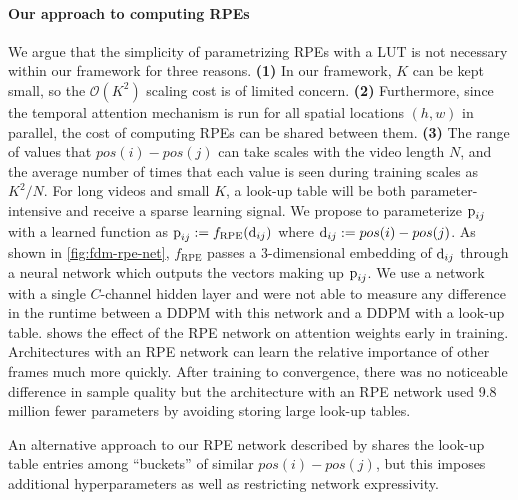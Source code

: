\paragraph{Our approach to computing RPEs}
We argue that the simplicity of parametrizing RPEs with a LUT is not necessary within our framework for three reasons. 
\textbf{(1)} In our framework, $K$ can be kept small, so the $\mathcal{O}(K^2)$ scaling cost is of limited concern. 
\textbf{(2)} Furthermore, since the temporal attention mechanism is run for all spatial locations $(h, w)$ in parallel, the cost of computing RPEs can be shared between them.
\textbf{(3)} The range of values that $pos(i)-pos(j)$ can take scales with the video length $N$, and the average number of times that each value is seen during training scales as ${K^2/N}$. For long videos and small $K$, a look-up table will be both parameter-intensive and receive a sparse learning signal. 
%
We propose to parameterize ${\textnormal{p}}_{ij}$ with a learned function as ${{\textnormal{p}}_{ij} := f_\text{RPE}({\textnormal{d}}_{ij})}$ where ${\textnormal{d}}_{ij} := pos(i)-pos(j)$. As shown in \cref{fig:fdm-rpe-net}, $f_\text{RPE}$ passes a 3-dimensional embedding of ${\textnormal{d}}_{ij}$ through a neural network which outputs the vectors making up ${\textnormal{p}}_{ij}$. We use a network with a single $C$-channel hidden layer and were not able to measure any difference in the runtime between a DDPM with this network and a DDPM with a look-up table.   shows the effect of the RPE network on attention weights early in training. Architectures with an RPE network can learn the relative importance of other frames much more quickly. After training to convergence, there was no noticeable difference in sample quality but the architecture with an RPE network used 9.8 million fewer parameters by avoiding storing large look-up tables.

An alternative approach to our RPE network described by \citet{wu2021rethinking} shares the look-up table entries among ``buckets'' of similar $pos(i)-pos(j)$, but this imposes additional hyperparameters as well as restricting network expressivity.

